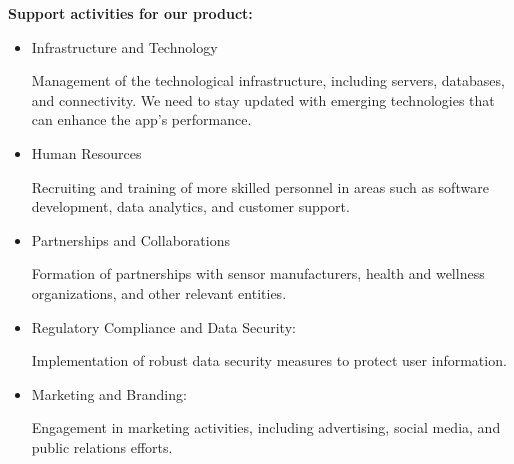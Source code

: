 \textbf{Support activities for our product:}
\begin{itemize}
    \item Infrastructure and Technology

    Management of the technological infrastructure, including servers, databases, and connectivity. We need to stay updated with emerging technologies that can enhance the app's performance.
    \item Human Resources

    Recruiting and training of more skilled personnel in areas such as software development, data analytics, and customer support.
    \item Partnerships and Collaborations

    Formation of partnerships with sensor manufacturers, health and wellness organizations, and other relevant entities. 
    \item Regulatory Compliance and Data Security:

    Implementation of robust data security measures to protect user information.
    \item Marketing and Branding:

    Engagement in marketing activities, including advertising, social media, and public relations efforts.
\end{itemize}